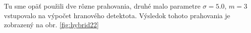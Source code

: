 \documentclass[a4paper,11pt,oneside]{article}%
\begin{document}
Tu sme opäť použili dve rôzne prahovania, druhé malo parametre $\sigma = 5.0$, $m = 3$ vstupovalo na výpočet hranového detektota. Výsledok tohoto prahovania je zobrazený na obr. \ref{fig:hybrid22}

\begin{figure}[H]  
    \hspace{5px}

\end{figure}
\end{document}
